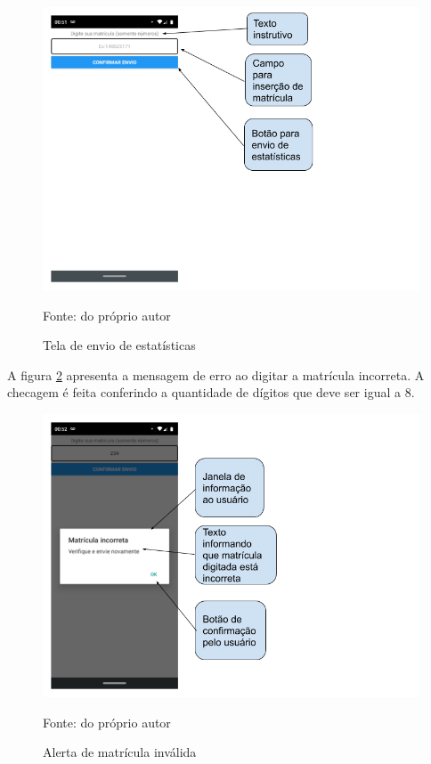 \begin{figure}[H]
\centering
\caption{Tela de envio de estatísticas}
\includegraphics[scale=0.5]{figuras/estatisticas/envio_estatisticas.png}

\label{envio_estatisticas}
\small{Fonte: do próprio autor}
\end{figure}

A figura \ref{matricula_incorreta} apresenta a mensagem de erro ao digitar a matrícula incorreta. A checagem é feita conferindo a quantidade de dígitos que deve ser igual a 8.


\begin{figure}[H]
\centering
\caption{Alerta de matrícula inválida}
\includegraphics[scale=0.5]{figuras/estatisticas/matricula_incorreta.png}

\label{matricula_incorreta}
\small{Fonte: do próprio autor}
\end{figure}

